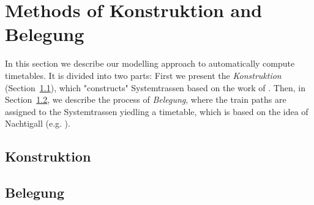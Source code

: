 \section{Methods of Konstruktion and Belegung}
\label{chap:methods}
In this section we describe our modelling approach to automatically compute timetables. It is divided into two parts: First we present the \emph{Konstruktion} (Section~\ref{chap:Konstruktion}), which "constructs" Systemtrassen based on the work of \cite{O:2009}. Then, in Section~\ref{chap:Belegung}, we describe the process of \emph{Belegung}, where the train paths are assigned to the Systemtrassen yiedling a timetable, which is based on the idea of Nachtigall (e.g. \cite{NO:2014, N:1998, N:2015}).

\subsection{Konstruktion}
\label{chap:Konstruktion}

\subsection{Belegung}
\label{chap:Belegung}